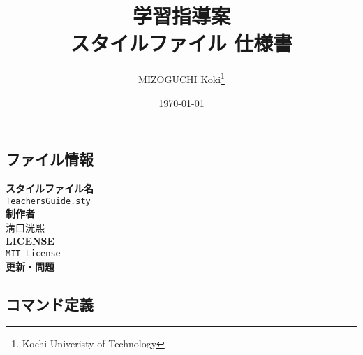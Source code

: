 \documentclass[paper=a4,fontsize=10.5pt]{jlreq}
\title{\textbf{学習指導案}\\ \LaTeXe スタイルファイル 仕様書}
\author{MIZOGUCHI Koki\thanks{Kochi Univeristy of Technology}}
\date{\today}
\begin{document}
\maketitle
\begin{leftbar}
    \section*{ファイル情報}
\end{leftbar}
\begin{framed}
    \begin{multicols}{2}
        \noindent\textbf{スタイルファイル名}\\
        \hspace{0.5em}\verb|TeachersGuide.sty|\\
        \textbf{制作者}\\
        \hspace{0.5em}溝口洸熙\\
        \newline
        \textbf{LICENSE}\\
        \hspace{0.5em}\verb|MIT License|\\
        \textbf{更新・問題}\\
    \end{multicols}
\end{framed}
\begin{leftbar}
    \section*{コマンド定義}
\end{leftbar}
\end{document}
